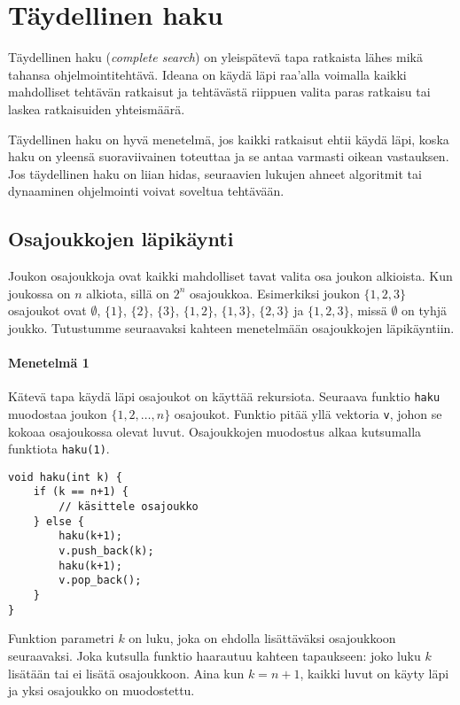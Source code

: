 \chapter{Täydellinen haku}

Täydellinen haku (\textit{complete search})
on yleispätevä tapa ratkaista
lähes mikä tahansa ohjelmointitehtävä.
Ideana on käydä läpi raa'alla voimalla kaikki
mahdolliset tehtävän ratkaisut ja tehtävästä riippuen
valita paras ratkaisu
tai laskea ratkaisuiden yhteismäärä.
          
Täydellinen haku on hyvä menetelmä, jos kaikki
ratkaisut ehtii käydä läpi,
koska haku on yleensä suoraviivainen toteuttaa
ja se antaa varmasti oikean vastauksen.
Jos täydellinen haku on liian hidas,
seuraavien lukujen ahneet algoritmit tai
dynaaminen ohjelmointi voivat soveltua
tehtävään.

\section{Osajoukkojen läpikäynti}


Joukon osajoukkoja ovat kaikki mahdolliset
tavat valita osa joukon alkioista.
Kun joukossa on $n$ alkiota,
sillä on $2^n$ osajoukkoa.
Esimerkiksi joukon $\{1,2,3\}$
osajoukot ovat $\emptyset$,
$\{1\}$, $\{2\}$, $\{3\}$,
$\{1,2\}$, $\{1,3\}$, $\{2,3\}$ ja $\{1,2,3\}$,
missä $\emptyset$ on tyhjä joukko.
Tutustumme seuraavaksi kahteen menetelmään
osajoukkojen läpikäyntiin.

\subsubsection{Menetelmä 1}

Kätevä tapa käydä läpi osajoukot on
käyttää rekursiota.
Seuraava funktio \texttt{haku} muodostaa
joukon $\{1,2,\ldots,n\}$ osajoukot.
Funktio pitää yllä vektoria \texttt{v},
johon se kokoaa osajoukossa olevat luvut.
Osajoukkojen muodostus alkaa kutsumalla
funktiota \texttt{haku(1)}.

\begin{lstlisting}
void haku(int k) {
    if (k == n+1) {
        // käsittele osajoukko
    } else {
        haku(k+1);
        v.push_back(k);
        haku(k+1);
        v.pop_back();
    }
}
\end{lstlisting}

Funktion parametri $k$ on luku,
joka on ehdolla lisättäväksi osajoukkoon seuraavaksi.
Joka kutsulla funktio haarautuu kahteen tapaukseen:
joko luku $k$ lisätään tai ei lisätä osajoukkoon.
Aina kun $k=n+1$, kaikki luvut on käyty läpi
ja yksi osajoukko on muodostettu.

